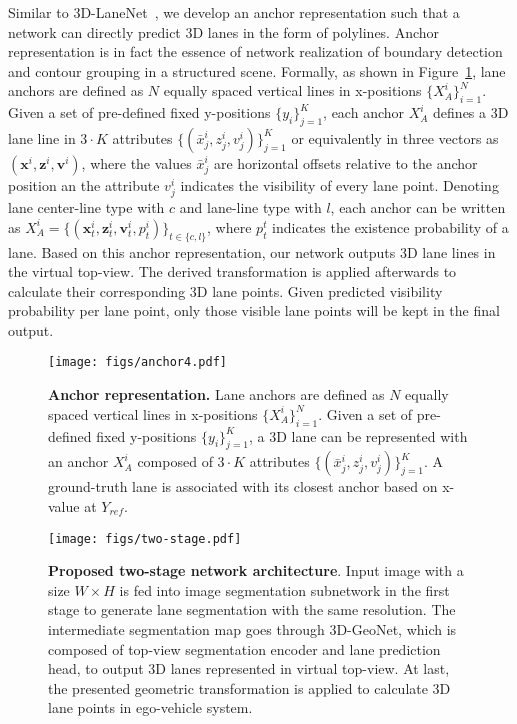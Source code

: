 \documentclass[10pt,twocolumn,letterpaper]{article}
\begin{document}
 
Similar to 3D-LaneNet~\cite{Garnett:etal:ICCV2019}, we develop an anchor representation such that a network can directly predict 3D lanes in the form of polylines. Anchor representation is in fact the essence of network realization of boundary detection and contour grouping in a structured scene. Formally, as shown in Figure~\ref{fig:Anchors}, lane anchors are defined as $N$ equally spaced vertical lines in x-positions $\{X^i_A \}^N_{i=1}$. Given a set of pre-defined fixed y-positions $\{y_i\}^K_{j=1}$, each anchor $X^i_A$ defines a 3D lane line in $3 \cdot K$ attributes $\{(\bar{x}^i_j, z^i_j, v^i_j)\}^K_{j=1}$ or equivalently in three vectors as $(\mathbf{x}^i, \mathbf{z}^i, \mathbf{v}^i)$, where the values $\bar{x}^i_j$ are horizontal offsets relative to the anchor position an the attribute $v^i_j$ indicates the visibility of every lane point. Denoting lane center-line type with $c$ and lane-line type with $l$, each anchor can be written as $X^i_A = \{(\mathbf{x}^i_t, \mathbf{z}^i_t, \mathbf{v}^i_t, p^i_t)\}_{t\in\{c, l\}}$, where $p^t_t$ indicates the existence probability of a lane. Based on this anchor representation, our network outputs 3D lane lines in the virtual top-view. The derived transformation is applied afterwards to calculate their corresponding 3D lane points. Given predicted visibility probability per lane point, only those visible lane points will be kept in the final output.

\begin{figure}[!h]
  \centering
    \texttt{[image: figs/anchor4.pdf]}
\caption{\textbf{Anchor representation.} Lane anchors are defined as $N$ equally spaced vertical lines in x-positions $\{X^i_A \}^N_{i=1}$. Given a set of pre-defined fixed y-positions $\{y_i\}^K_{j=1}$, a 3D lane can be represented with an anchor $X^i_A$ composed of  $3 \cdot K$ attributes $\{(\bar{x}^i_j, z^i_j, v^i_j)\}^K_{j=1}$. A ground-truth lane is associated with its closest anchor based on x-value at $Y_{ref}$.}
  \label{fig:Anchors}
\end{figure}

\begin{figure*}[!h]
  \centering
\texttt{[image: figs/two-stage.pdf]}
  
\caption{\textbf{Proposed two-stage network architecture}. Input image with a size $W \times H$ is fed into image segmentation subnetwork in the first stage to generate lane segmentation with the same resolution. The intermediate segmentation map goes through 3D-GeoNet, which is composed of top-view segmentation encoder and lane prediction head, to output 3D lanes represented in virtual top-view. At last, the presented geometric transformation is applied to calculate 3D lane points in ego-vehicle system.}
  \label{fig:GenLaneNet}
\end{figure*}
\end{document}
